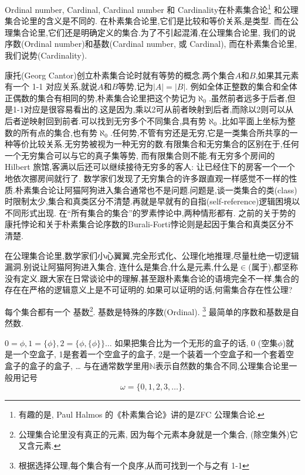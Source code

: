 \documentclass[main.tex]{subfiles}
\begin{document}
Ordinal number, Cardinal, Cardinal number 和 Cardinality在朴素集合论\footnote{有趣的是, Paul Halmos 的《朴素集合论》\cite{HalmosP}讲的是ZFC 公理集合论.}
和公理集合论里的含义是不同的. 
在朴素集合论里,它们是比较和等价关系,是类型.
而在公理集合论里,它们还是明确定义的集合.为了不引起混淆,在公理集合论里,
我们的说序数(Ordinal number)和基数(Cardinal number, 或 Cardinal),
而在朴素集合论里,我们说势(Cardinality).

康托(Georg Cantor)创立朴素集合论时就有等势的概念.两个集合$A$和$B$,如果其元素有一个 1-1 对应关系,就说$A$和$B$等势,记为$|A|=|B|$.
例如全体正整数的集合和全体正偶数的集合有相同的势,朴素集合论里把这个势记为$\aleph_0$.虽然前者远多于后者,但是1-1对应是很容易看出的.这是因为,乘以2可从前者映射到后者,而除以2则可以从后者逆映射回到前者.可以找到无穷多个不同集合,具有势$\aleph_0$.比如平面上坐标为整数的所有点的集合,也有势$\aleph_0$.任何势,不管有穷还是无穷,它是一类集合所共享的一种等价比较关系.无穷势被视为一种无穷的数.有限集合和无穷集合的区别在于,任何一个无穷集合可以与它的真子集等势, 而有限集合则不能.有无穷多个房间的Hilbert 旅馆,客满以后还可以继续接待无穷多的客人: 让已经住下的房客一个一个地依次挪房间就行了.
数学家们发现了无穷集合的许多跟直观一样感觉不一样的性质.朴素集合论让阿猫阿狗进入集合通常也不是问题.问题是,谈一类集合的类(class)时限制太少,集合和真类区分不清楚.再就是早就有的自指(self-reference)逻辑困境以不同形式出现.
在“所有集合的集合”的罗素悖论中,两种情形都有.
之前的关于势的康托悖论和关于朴素集合论序数的Burali-Forti悖论则是起因于集合和真类区分不清楚.

在公理集合论里,数学家们小心翼翼,完全形式化、公理化地推理,尽量杜绝一切逻辑漏洞.别说让阿猫阿狗进入集合, 连什么是集合,什么是元素,什么是$\in$(属于),都坚称没有定义.跟大家在日常谈论中的理解,甚至跟朴素集合论的语境完全不一样,集合的存在在严格的逻辑意义上是不可证明的.如果可以证明的话,何需集合存在性公理?

每个集合都有一个
基数\footnote{公理集合论里没有真正的元素,
	因为每个元素本身就是一个集合, (除空集外)它又含元素.}. 
基数是特殊的序数(Ordinal).
\footnote{根据选择公理,每个集合有一个良序,从而可找到一个与之有 1-1 }
最简单的序数和基数是自然数.

$0 = \phi, 1 = \{\phi\}, 2 = \{\phi, \{\phi\}\}\dots$
如果把集合比为一个无形的盒子的话, 0 (空集$\phi$)就是一个空盒子, 1是套着一个空盒子的盒子,
2是一个装着一个空盒子和一个套着空盒子的盒子的盒子, \dots
与在通常数学里用$\mathbb{N}$表示自然数的集合不同,公理集合论里一般用记号
$$\omega = \{0, 1, 2, 3, \dots\}.$$
\end{document}
